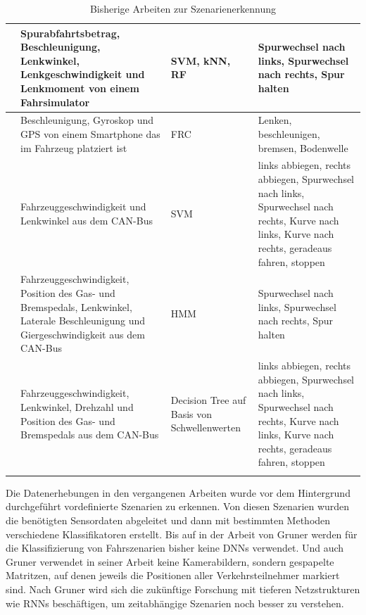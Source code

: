 \begin{longtable}[c]{p{} p{4.5cm} p{} p{4.5cm}}
\cite{zheng2016drivers} & Spurabfahrtsbetrag, Beschleunigung, Lenkwinkel, Lenkgeschwindigkeit und Lenkmoment von einem Fahrsimulator & \ac{SVM}, \ac{kNN}, \ac{RF} & Spurwechsel nach links, Spurwechsel nach rechts, Spur halten \\
\hline

\cite{arroyo2016adaptive} & Beschleunigung, Gyroskop und GPS von einem Smartphone das im Fahrzeug platziert ist & \ac{FRC} & Lenken, beschleunigen, bremsen, Bodenwelle \\
\hline

\cite{zheng2015non} & Fahrzeuggeschwindigkeit und Lenkwinkel aus dem CAN-Bus & \ac{SVM} & links abbiegen, rechts abbiegen, Spurwechsel nach links, Spurwechsel nach rechts, Kurve nach links, Kurve nach rechts, geradeaus fahren, stoppen \\
\hline

\cite{li2015lane} & Fahrzeuggeschwindigkeit, Position des Gas- und Bremspedals, Lenkwinkel, Laterale Beschleunigung und Giergeschwindigkeit aus dem CAN-Bus & \ac{HMM} & Spurwechsel nach links, Spurwechsel nach rechts, Spur halten \\
\hline

\cite{zheng2014threshold} & Fahrzeuggeschwindigkeit, Lenkwinkel, Drehzahl und Position des Gas- und Bremspedals aus dem CAN-Bus & Decision Tree auf Basis von Schwellenwerten & links abbiegen, rechts abbiegen, Spurwechsel nach links, Spurwechsel nach rechts, Kurve nach links, Kurve nach rechts, geradeaus fahren, stoppen \\

\hline
\caption{Bisherige Arbeiten zur Szenarienerkennung}
\label{tab_szenarienerkennung}
\end{longtable}

Die Datenerhebungen in den vergangenen Arbeiten wurde vor dem Hintergrund durchgeführt vordefinierte Szenarien zu erkennen. Von diesen Szenarien wurden die benötigten Sensordaten abgeleitet und dann mit bestimmten Methoden verschiedene Klassifikatoren erstellt. Bis auf in der Arbeit von Gruner \cite{gruner2017spatiotemporal} werden für die Klassifizierung von Fahrszenarien bisher keine \acp{DNN} verwendet. Und auch Gruner verwendet in seiner Arbeit keine Kamerabildern, sondern gespapelte Matritzen, auf denen jeweils die Positionen aller Verkehrsteilnehmer markiert sind. Nach Gruner \cite{gruner2017spatiotemporal} wird sich die zukünftige Forschung mit tieferen Netzstrukturen wie \acp{RNN} beschäftigen, um zeitabhängige Szenarien noch besser zu verstehen.

